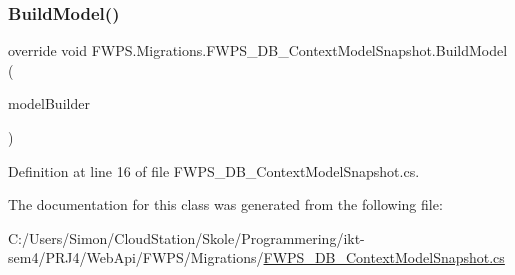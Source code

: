 \subsubsection{\texorpdfstring{Build\+Model()}{BuildModel()}}
{\footnotesize\ttfamily override void F\+W\+P\+S.\+Migrations.\+F\+W\+P\+S\+\_\+\+D\+B\+\_\+\+Context\+Model\+Snapshot.\+Build\+Model (\begin{DoxyParamCaption}\item[{Model\+Builder}]{model\+Builder }\end{DoxyParamCaption})\hspace{0.3cm}{\ttfamily [protected]}}



Definition at line 16 of file F\+W\+P\+S\+\_\+\+D\+B\+\_\+\+Context\+Model\+Snapshot.\+cs.



The documentation for this class was generated from the following file\+:\begin{DoxyCompactItemize}
\item 
C\+:/\+Users/\+Simon/\+Cloud\+Station/\+Skole/\+Programmering/ikt-\/sem4/\+P\+R\+J4/\+Web\+Api/\+F\+W\+P\+S/\+Migrations/\mbox{\hyperlink{_f_w_p_s___d_b___context_model_snapshot_8cs}{F\+W\+P\+S\+\_\+\+D\+B\+\_\+\+Context\+Model\+Snapshot.\+cs}}\end{DoxyCompactItemize}
